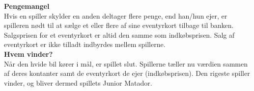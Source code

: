 \textbf{Pengemangel}
\\Hvis en spiller skylder en anden deltager flere penge, end han/hun ejer, er spilleren nødt til at sælge et eller flere af sine eventyrkort tilbage til banken. 
Salgsprisen for et eventyrkort er altid den samme som indkøbsprisen. 
Salg af eventyrkort er ikke tilladt indbyrdes mellem spillerne.\\

\textbf{Hvem vinder?}
\\Når den hvide bil kører i mål, er spillet slut. 
Spillerne tæller nu værdien sammen af deres kontanter samt de eventyrkort de ejer (indkøbsprisen). 
Den rigeste spiller vinder, og bliver dermed spillets Junior Matador.